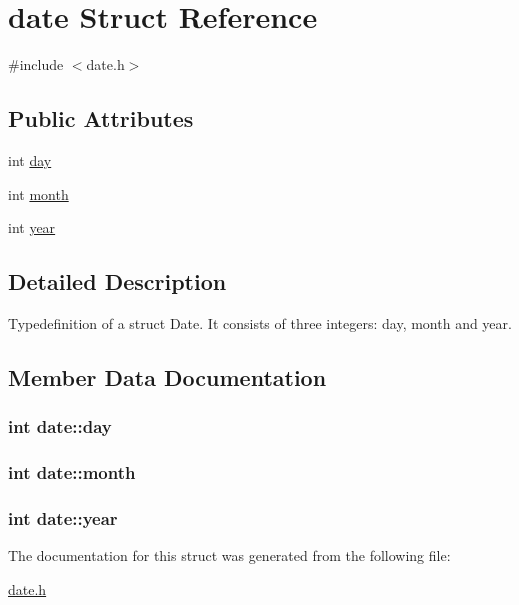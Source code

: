 \hypertarget{structdate}{\section{date Struct Reference}
\label{structdate}
}


{\ttfamily \#include $<$date.\-h$>$}

\subsection*{Public Attributes}
\begin{DoxyCompactItemize}
\item 
int \hyperlink{structdate_a2649784269c2be62800d1e4509ed2b56}{day}
\item 
int \hyperlink{structdate_a4007efea3f7afe04e9a195dc13f71f38}{month}
\item 
int \hyperlink{structdate_a12304556327d9ea913a0534a8554107a}{year}
\end{DoxyCompactItemize}


\subsection{Detailed Description}
Typedefinition of a struct Date. It consists of three integers\-: day, month and year. 

\subsection{Member Data Documentation}
\hypertarget{structdate_a2649784269c2be62800d1e4509ed2b56}{
\subsubsection[{day}]{\setlength{\rightskip}{0pt plus 5cm}int date\-::day}}\label{structdate_a2649784269c2be62800d1e4509ed2b56}
\hypertarget{structdate_a4007efea3f7afe04e9a195dc13f71f38}{
\subsubsection[{month}]{\setlength{\rightskip}{0pt plus 5cm}int date\-::month}}\label{structdate_a4007efea3f7afe04e9a195dc13f71f38}
\hypertarget{structdate_a12304556327d9ea913a0534a8554107a}{
\subsubsection[{year}]{\setlength{\rightskip}{0pt plus 5cm}int date\-::year}}\label{structdate_a12304556327d9ea913a0534a8554107a}


The documentation for this struct was generated from the following file\-:\begin{DoxyCompactItemize}
\item 
\hyperlink{date_8h}{date.\-h}\end{DoxyCompactItemize}
